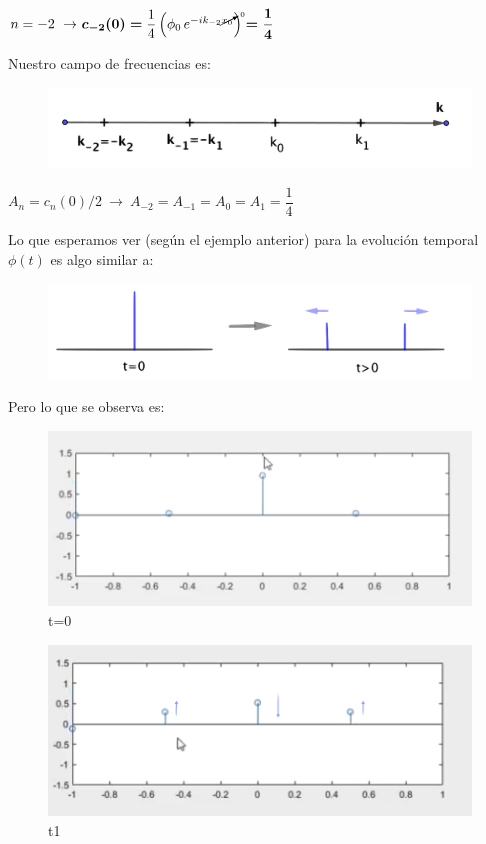 \begin{example}
\vspace{3mm} $n=-2 \ \to \ \boldsymbol{c_{-2}(0)=}\dfrac 1 4 \left( \phi_0 \, e^{-ik_{-2} \cancelto{0}{x_0} }  \right) \boldsymbol{=\dfrac 1 4 }$

\vspace{3mm}

\begin{multicols}{2}
Nuestro campo de frecuencias es:
	\begin{figure}[H]
	\centering
	\includegraphics[width=.4\textwidth]{imagenes/apendices-DFT15.png}
 \end{figure}
\end{multicols}


\vspace{3mm} $A_n=c_n(0)/2 \ \to \ A_{-2}=A_{-1}=A_0=A_1=\dfrac 1 4$

\vspace{3mm}Lo que esperamos ver (según el ejemplo anterior) para la evolución temporal $\phi(t)$ es algo similar a:

\begin{figure}[H]
	\centering
	\includegraphics[width=.6\textwidth]{imagenes/apendices-DFT12.png}
\end{figure}

Pero lo que se observa es: 

\vspace{5mm}
\begin{multicols}{2}
\begin{figure}[H]
	\centering
	\includegraphics[width=.45\textwidth]{imagenes/apendices-DFT8.png}
	\caption*{t=0}
\end{figure}	
\begin{figure}[H]
	\centering
	\includegraphics[width=.45\textwidth]{imagenes/apendices-DFT9.png}
	\caption*{t1}
\end{figure}	
\end{multicols}


\end{example}

